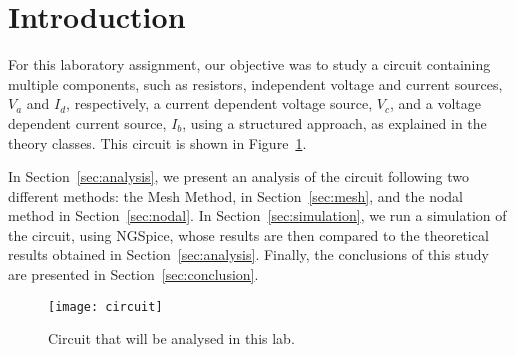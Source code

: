 \section{Introduction}
\label{sec:introduction}


For this laboratory assignment, our objective was to study a circuit containing multiple components, such as resistors, independent voltage and current sources, $V_a$ and  $I_d$, respectively, a current dependent voltage source, $V_c$, and a voltage dependent current source, $I_b$, using a structured approach, as explained in the theory classes.
This circuit is shown in Figure~\ref{fig:circuit}.

In Section~\ref{sec:analysis}, we present an analysis of the circuit following two different methods: the Mesh Method, in Section~\ref{sec:mesh}, and the nodal method in Section~\ref{sec:nodal}. 
In Section~\ref{sec:simulation}, we run a simulation of the circuit, using NGSpice, whose results are then compared to the theoretical results obtained in
Section~\ref{sec:analysis}. Finally, the conclusions of this study are presented in
Section~\ref{sec:conclusion}.

\begin{figure}[h] \centering
\texttt{[image: circuit]}
\caption{Circuit that will be analysed in this lab.}
\label{fig:circuit}
\end{figure}

